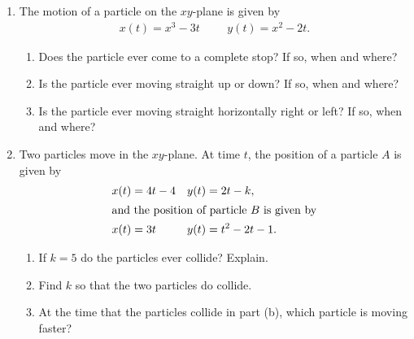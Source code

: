 \documentclass[12pt]{article}
\begin{document}
\drawtitle

\begin{enumerate}
\item The motion of a particle on the $xy$-plane is given by
  \begin{align*}
    x(t)=x^3-3t &&& y(t)=x^2-2t.
  \end{align*}

  \begin{enumerate}
  \item Does the particle ever come to a complete stop?  If so, when
    and where?
  \item Is the particle ever moving straight up or down?  If so, when
    and where?
  \item Is the particle ever moving straight horizontally right or
    left?  If so, when and where?
  \end{enumerate}

\item Two particles move in the $xy$-plane.  At time $t$, the position
  of a particle $A$ is given by
  \begin{align*}
    x(t) &= 4t-4 & y(t) &= 2t-k,\\
    \intertext{and the position of particle $B$ is given by}
    x(t) &= 3t & y(t) &= t^2-2t-1.
  \end{align*}

  \begin{enumerate}
  \item If $k=5$ do the particles ever collide?  Explain.
  \item Find $k$ so that the two particles do collide.
  \item At the time that the particles collide in part (b), which
    particle is moving faster?
  \end{enumerate}

\end{enumerate}
\end{document}
